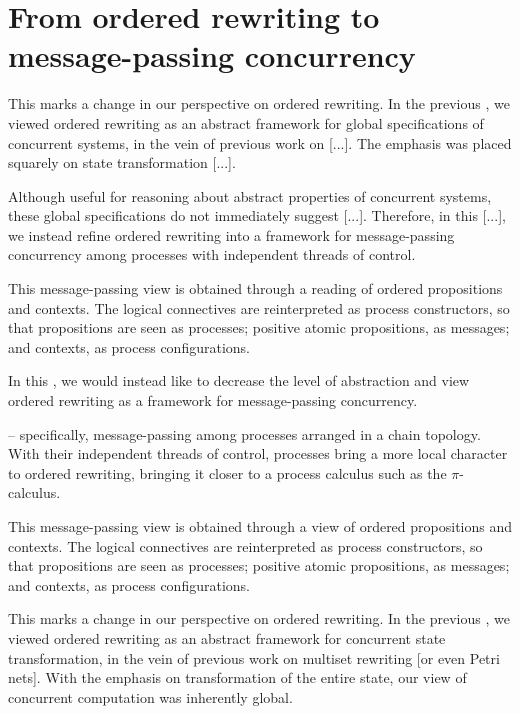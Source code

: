\chapter{From ordered rewriting to message-passing concurrency}\label{ch:ordered-bisimilarity}

This  marks a change in our perspective on ordered rewriting.
In the previous , we viewed ordered rewriting as an abstract framework for global specifications of concurrent systems, in the vein of previous work on [...].
The emphasis was placed squarely on state transformation [...].

Although useful for reasoning about abstract properties of concurrent systems, these global specifications do not immediately suggest [...].
Therefore, in this [...], we instead refine ordered rewriting into a framework for message-passing concurrency among processes with independent threads of control.

This message-passing view is obtained through a \autocite{??} reading of ordered propositions and contexts.
The logical connectives are reinterpreted as process constructors, so that propositions are seen as processes; positive atomic propositions, as messages; and contexts, as process configurations.

In this , we would instead like to decrease the level of abstraction and view ordered rewriting as a framework for message-passing concurrency.

 -- specifically, message-passing among processes arranged in a chain topology.
With their independent threads of control, processes bring a more local character to ordered rewriting, bringing it closer to a process calculus such as the $\pi$-calculus.

This message-passing view is obtained through a \autocite{??} view of ordered propositions and contexts.
The logical connectives are reinterpreted as process constructors, so that propositions are seen as processes; positive atomic propositions, as messages; and contexts, as process configurations.



This  marks a change in our perspective on ordered rewriting.
In the previous , we viewed ordered rewriting as an abstract framework for concurrent state transformation, in the vein of previous work on multiset rewriting\autocite{??} [or even Petri nets\autocite{??}].
With the emphasis on transformation of the entire state, our view of concurrent computation was inherently global.

